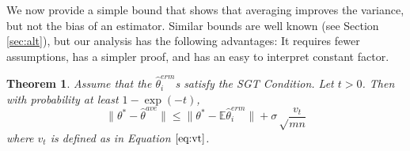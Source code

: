 \documentclass[twoside]{article}
\newtheorem{theorem}{Theorem}
\newcommand{\E}{\mathbb{E}}
\newcommand{\w}{\theta}
\newcommand{\wave}{\hat\w^{ave}}
\newcommand{\wmle}{\hat\w^{erm}}
\newcommand{\wstar}{{\w^{*}}}
\newcommand{\ltwo}[1]{{\lVert {#1} \rVert}}
\begin{document}
We now provide a simple bound that shows that averaging improves the variance,
but not the bias of an estimator.
Similar bounds are well known (see Section \ref{sec:alt}),
but our analysis has the following advantages:
It requires fewer assumptions, has a simpler proof, and has an easy to interpret constant factor.

\begin{theorem}
\label{thm:wave}
Assume that the $\wmle_i$s satisfy the SGT Condition.
Let $t>0$.
Then with probability at least $1-\exp(-t)$,
\begin{equation}
\ltwo{\wstar-\wave} \le \ltwo{\wstar-\E\wmle_i} + \sigma\sqrt\frac{v_t}{mn}
\end{equation}
where $v_t$ is defined as in Equation $\ref{eq:vt}$.
\end{theorem}
\end{document}
